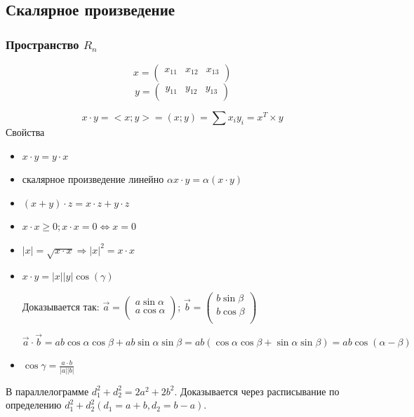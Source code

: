 \documentclass{article}
\begin{document}
\subsection*{Скалярное произведение}
\subsubsection*{Пространство $R_n$}
$$x = \begin{pmatrix}
	x_{11} & x_{12} & x_{13}\\
\end{pmatrix}$$
$$y = \begin{pmatrix}
	y_{11} & y_{12} & y_{13}\\
\end{pmatrix}$$

$$x\cdot y  = <x;y> = (x;y) = \sum x_iy_i = x^T\times y$$
Свойства
\begin{itemize}
\item $x\cdot y = y\cdot x$
\item скалярное произведение линейно $\alpha x\cdot y = \alpha(x\cdot y)$
\item $(x+y)\cdot z = x\cdot z + y\cdot z$
\item $x\cdot x \ge 0; x\cdot x = 0 \Leftrightarrow x=0$
\item $|x| = \sqrt{x\cdot x} \Rightarrow |x|^2 = x\cdot x$
\item $x\cdot y = |x||y|\cos(\gamma)$

Доказывается так:
$\vec a = \begin{pmatrix}
	a\sin\alpha\\
	a\cos\alpha\\
\end{pmatrix}$;
$\vec b = \begin{pmatrix}
	b\sin\beta\\
	b\cos\beta\\
\end{pmatrix}$

$\vec a\cdot \vec b = ab\cos\alpha \cos\beta + ab\sin\alpha\sin\beta = ab(\cos\alpha \cos\beta +\sin\alpha\sin\beta) =ab\cos(\alpha-\beta)$

\item $\cos \gamma = \frac{a\cdot b}{|a||b|}$

\end{itemize}

В параллелограмме $d_1^2 + d_2^2 = 2a^2+2b^2$. Доказывается через расписывание по определению $d_1^2+d_2^2(d_1 = a+b, d_2 = b-a)$.
\end{document}
